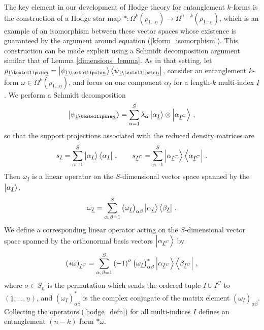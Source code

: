 \documentclass[12pt]{article}
\newcommand{\ul}[1]{{\underline{#1}}}
\numberwithin{equation}{section}
\newcommand{\rhooneton}{{\rho_{\ul{1} \ldots \ul{n}}}}
\newcommand{\psioneton}{{\psi_{\ul{1} \ldots \ul{n}}}}
\begin{document}
The key element in our development of Hodge theory for entanglement $k$-forms is the construction of a Hodge star map $\ast : \Omega^k ( \rhooneton ) \to \Omega^{n-k} ( \rhooneton )$, which is an example of an isomorphism between these vector spaces whose existence is guaranteed by the argument around equation (\ref{kform_isomorphism}). This construction can be made explicit using a Schmidt decomposition argument similar that of Lemma \ref{dimensions_lemma}. As in that setting, let $\rhooneton = \ket{\psioneton} \bra{\psioneton}$, consider an entanglement $k$-form $\omega \in \Omega^k ( \rhooneton )$, and focus on one component $\alpha_{\ul{I}}$ for a length-$k$ multi-index $\ul{I}$. We perform a Schmidt decomposition
%
\begin{align}
    \ket{ \psioneton } = \sum_{\alpha = 1}^{S} \lambda_\alpha \ket{ \alpha_{\ul{I}} } \otimes \ket{ \alpha_{\ul{I}^C} } \, ,
\end{align}
%
so that the support projections associated with the reduced density matrices are
%
\begin{align}
    s_{\ul{I}} = \sum_{\alpha = 1}^{S} \ket{\alpha_{\ul{I}}} \bra{\alpha_{\ul{I}}} \, , \qquad s_{\ul{I}^C} = \sum_{\alpha = 1}^{S} \ket{\alpha_{\ul{I}^C}} \bra{\alpha_{\ul{I}^C}} \, .
\end{align}
%
Then $\omega_{\ul{I}}$ is a linear operator on the $S$-dimensional vector space spanned by the $\ket{\alpha_{\ul{I}} }$,
%
\begin{align}
    \omega_{\ul{I}} = \sum_{\alpha, \beta = 1}^{S} \left( \omega_{\ul{I}} \right)_{\alpha \beta} \ket{ \alpha_{\ul{I}}} \bra{\beta_{\ul{I}}} \, .
\end{align}
%
We define a corresponding linear operator acting on the $S$-dimensional vector space spanned by the orthonormal basis vectors $\ket{\alpha_{\ul{I}^C}}$ by
%
\begin{align}\label{hodge_defn}
    \left( \ast \omega \right)_{\ul{I}^C} = \sum_{\alpha, \beta = 1}^{S} \left( - 1 \right)^\sigma \left( \omega_{\ul{I}} \right)_{\alpha \beta}^\ast \ket{ \alpha_{\ul{I}^C}} \bra{\beta_{\ul{I}^C}} \, ,
\end{align}
%
where $\sigma \in S_{\ul{n}}$ is the permutation which sends the ordered tuple $\ul{I} \cup \ul{I}^C$ to $( \ul{1} , \ldots , \ul{n} )$, and $\left( \omega_{\ul{I}} \right)_{\alpha \beta}^\ast$ is the complex conjugate of the matrix element $\left( \omega_{\ul{I}} \right)_{\alpha \beta}$. Collecting the operators (\ref{hodge_defn}) for all multi-indices $\ul{I}$ defines an entanglement $(n-k)$ form $\ast \omega$.
\end{document}
